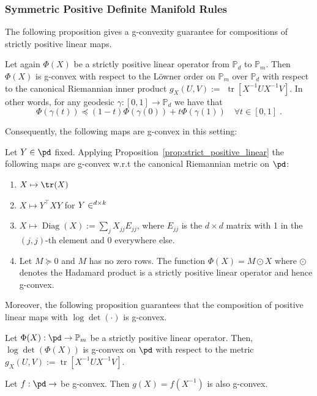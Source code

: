 \documentclass[twoside,11pt]{article}
\begin{document}
\subsubsection{Symmetric Positive Definite Manifold Rules}
The following proposition gives a g-convexity guarantee for compositions of strictly positive linear maps.
%
\begin{prop}\label{prop:strict_positive_linear}
    Let again $\Phi(X)$ be a strictly positive linear operator from $\mathbb{P}_d$ to $\mathbb{P}_m$. Then $\Phi(X)$ is g-convex with respect to the Löwner order on $\mathbb{P}_m$ over $\mathbb{P}_d$ with respect to the canonical Riemannian inner product $g_X(U, V):=$ $\operatorname{tr}\left[X^{-1} U X^{-1} V\right]$. In other words, for any geodesic $\gamma:[0,1] \rightarrow \mathbb{P}_d$ we have that
$$
\Phi(\gamma(t)) \preceq(1-t) \Phi(\gamma(0))+t \Phi(\gamma(1)) \quad \forall t \in[0,1] \; .
$$
\end{prop}
%
Consequently, the following maps are g-convex in this setting:
%
\begin{example}
    Let $Y \in \pd$ fixed. Applying Proposition~\ref{prop:strict_positive_linear} the following maps are g-convex w.r.t the canonical Riemannian metric on $\pd$:
    \begin{enumerate}
    \item $X \mapsto \tr(X)$ 
    \item $X \mapsto Y^\top X Y$ for $Y \in \real^{d \times k}$
    \item $X \mapsto \operatorname{Diag}(X) := \sum_{j}X_{jj}E_{jj}$, where $E_{jj}$ is the $d\times d$ matrix with 1 in the $(j,j)$-th element and 0 everywhere else.
    \item Let $M \succeq 0$ and $M$ has no zero rows.  The function $\Phi(X) = M \odot X$ where $\odot$ denotes the Hadamard product is a strictly positive linear operator and hence g-convex.
    \end{enumerate}
\end{example}
%
Moreover, the following proposition guarantees that the composition of positive linear maps with $\log \det(\cdot)$ is g-convex.
%
\begin{prop}\label{prop:logdet_gcvx} Let $\Phi(X):\pd \to \mathbb{P}_m$ be a strictly positive linear operator. Then, $\log \operatorname{det}(\Phi(X))$ is g-convex on $\pd$ with respect to the metric $g_X(U, V):=\operatorname{tr}\left[X^{-1} U X^{-1} V\right]$.
\end{prop}
%
\begin{prop}\label{lemma:inverse_gcvx}
    Let $f: \pd \to \real$ be g-convex.
    Then $g(X) = f(X^{-1})$ is also g-convex.
\end{prop}
\end{document}
